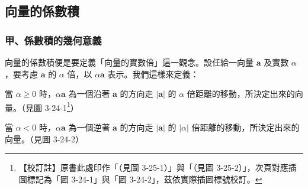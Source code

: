 \subsection{向量的係數積}
\label{sec:b3s-3-4}

\subsubsection*{甲、係數積的幾何意義}

向量的係數積便是要定義「向量的實數倍」這一觀念。設任給一向量 $\mathbf{a}$ 及實數 $\alpha$，要考慮 $\mathbf{a}$ 的 $\alpha$ 倍，以 $\alpha\mathbf{a}$ 表示。我們這樣來定義：

\label{note:b3s-ch3-p93-fig-ref}%
\begin{definition}
當 $\alpha \ge 0$ 時，$\alpha\mathbf{a}$ 為一個沿著 $\mathbf{a}$ 的方向走 $|\mathbf{a}|$ 的 $\alpha$ 倍距離的移動，所決定出來的向量。（見圖 3-24-1\footnote{【校訂註】原書此處印作「（見圖 3-25-1）」與「（見圖 3-25-2）」，次頁對應插圖標記為「圖 3-24-1」與「圖 3-24-2」，茲依實際插圖標號校訂。}）

當 $\alpha < 0$ 時，$\alpha\mathbf{a}$ 為一個逆著 $\mathbf{a}$ 的方向走 $|\mathbf{a}|$ 的 $|\alpha|$ 倍距離的移動，所決定出來的向量。（見圖 3-24-2）
\end{definition}

